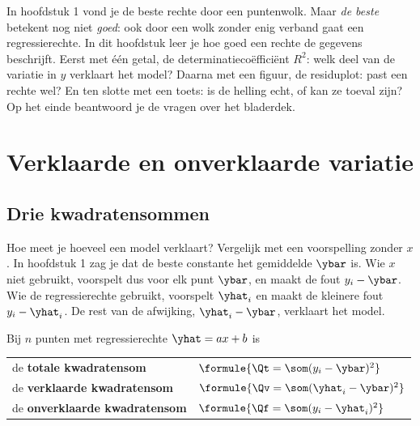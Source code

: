 In hoofdstuk 1 vond je de beste rechte door een puntenwolk. Maar \textit{de beste} betekent nog niet \textit{goed}: ook door een wolk zonder enig verband gaat een regressierechte. In dit hoofdstuk leer je hoe goed een rechte de gegevens beschrijft. Eerst met één getal, de determinatiecoëfficiënt $R^2$: welk deel van de variatie in $y$ verklaart het model? Daarna met een figuur, de residuplot: past een rechte wel? En ten slotte met een toets: is de helling echt, of kan ze toeval zijn? Op het einde beantwoord je de vragen over het bladerdek.

\begin{oefeningen}[Start]

\end{oefeningen}

\section{Verklaarde en onverklaarde variatie}

\subsection{Drie kwadratensommen}

Hoe meet je hoeveel een model verklaart? Vergelijk met een voorspelling zonder $x$. In hoofdstuk 1 zag je dat de beste constante het gemiddelde $\ybar$ is. Wie $x$ niet gebruikt, voorspelt dus voor elk punt $\ybar$, en maakt de fout $y_i - \ybar$. Wie de regressierechte gebruikt, voorspelt $\yhat_i$ en maakt de kleinere fout $y_i - \yhat_i$. De rest van de afwijking, $\yhat_i - \ybar$, verklaart het model.

\begin{theorie}
Bij $n$ punten met regressierechte $\yhat = ax + b$ is

\vspace{1mm}
{\renewcommand{\arraystretch}{2.2}\begin{tabular}{@{\qquad}l@{\qquad}l}
de \textbf{\textcolor{accent}{totale kwadratensom}} & $\formule{\Qt = \som (y_i - \ybar)^2}$ \\
de \textbf{\textcolor{accent}{verklaarde kwadratensom}} & $\formule{\Qv = \som (\yhat_i - \ybar)^2}$ \\
de \textbf{\textcolor{accent}{onverklaarde kwadratensom}} & $\formule{\Qf = \som (y_i - \yhat_i)^2}$
\end{tabular}}
\end{theorie}

